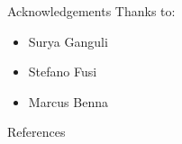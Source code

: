 \documentclass{beamer}%
\begin{document}
%
%
%

\begin{frame}{Acknowledgements}
%
 Thanks to:
 \begin{itemize}
   \item Surya Ganguli
   \item Stefano Fusi
   \item Marcus Benna
 \end{itemize}
%
\end{frame}


\begin{frame}[allowframebreaks]{References}
%

 {\small
 
 
 }
%
\end{frame}


\end{document}
